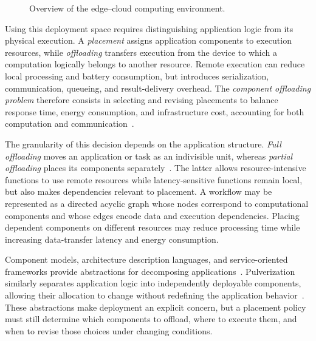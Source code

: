 \begin{figure}
  \centering
  \def\svgwidth{0.8\linewidth}\footnotesize
  
  \caption{Overview of the edge--cloud computing environment.}
  \label{fig:edge-cloud-system}
\end{figure}

Using this deployment space requires distinguishing application logic from its physical execution.
%
A \emph{placement} assigns application components to execution resources,
 while \emph{offloading} transfers execution from the device to which a computation logically belongs to another resource.
%
Remote execution can reduce local processing and battery consumption,
 but introduces serialization, communication, queueing, and result-delivery overhead.
%
The \emph{component offloading problem} therefore consists in selecting and revising placements
 to balance response time, energy consumption, and infrastructure cost,
 accounting for both computation and communication~\cite{DBLP:journals/cn/SaeikASSDVLAMP21}.

The granularity of this decision depends on the application structure.
%
\emph{Full offloading} moves an application or task as an indivisible unit,
 whereas \emph{partial offloading} places its components separately~\cite{DBLP:journals/access/WangWHSQ20}.
%
The latter allows resource-intensive functions to use remote resources while latency-sensitive functions remain local,
 but also makes dependencies relevant to placement.
%
A workflow may be represented as a directed acyclic graph whose nodes correspond
 to computational components and whose edges encode data and execution dependencies.
%
Placing dependent components on different resources may reduce processing time
 while increasing data-transfer latency and energy consumption.

Component models, architecture description languages,
 and service-oriented frameworks provide abstractions for decomposing
 applications~\cite{DBLP:journals/tse/CrnkovicSVC11,DBLP:conf/isola/BallouliBBS18,DBLP:journals/csur/LemosDB16}.
%
Pulverization similarly separates application logic into independently deployable components,
 allowing their allocation to change without redefining the application behavior~\cite{DBLP:journals/fgcs/FarabegoliPCV24}.
%
These abstractions make deployment an explicit concern,
 but a placement policy must still determine which components to offload,
 where to execute them, and when to revise those choices under changing conditions.

